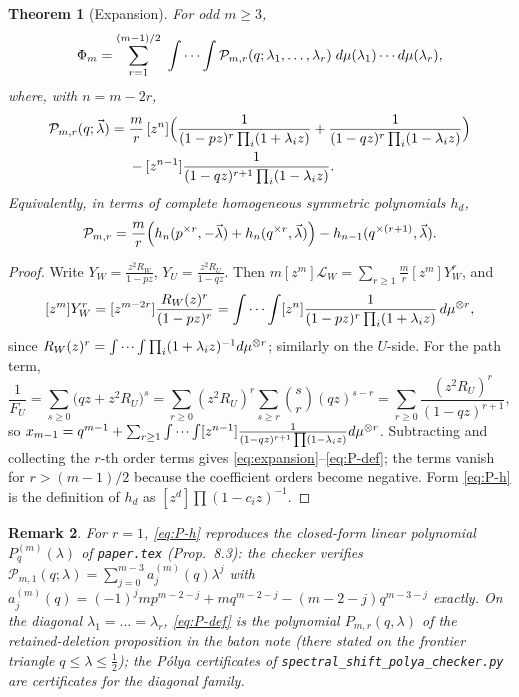 \documentclass[11pt]{article}
\newtheorem{theorem}{Theorem}[section]
\newtheorem{remark}[theorem]{Remark}
\newcommand{\Pcal}{\mathcal P}
\begin{document}
\begin{theorem}[Expansion]\label{thm:expansion}
For odd $m\ge3$,
\begin{equation}\label{eq:expansion}
        \Phi_m=\sum_{r=1}^{(m-1)/2}\ \idotsint\Pcal_{m,r}(q;\lambda_1,\dots,\lambda_r)\;d\mu(\lambda_1)\cdots d\mu(\lambda_r),
\end{equation}
where, with $n=m-2r$,
\begin{equation}\label{eq:P-def}
\begin{aligned}
        \Pcal_{m,r}(q;\vec\lambda)
        ={}&\frac mr\,[z^{n}]\Bigl(\frac{1}{(1-pz)^r\prod_i(1+\lambda_iz)}
        +\frac{1}{(1-qz)^r\prod_i(1-\lambda_iz)}\Bigr)\\
        &-[z^{n-1}]\frac{1}{(1-qz)^{r+1}\prod_i(1-\lambda_iz)} .
\end{aligned}
\end{equation}
Equivalently, in terms of complete homogeneous symmetric polynomials $h_d$,
\begin{equation}\label{eq:P-h}
        \Pcal_{m,r}=\frac mr\Bigl(h_n(p^{\times r},-\vec\lambda)+h_n(q^{\times r},\vec\lambda)\Bigr)
        -h_{n-1}(q^{\times(r+1)},\vec\lambda).
\end{equation}
\end{theorem}

\begin{proof}
Write $Y_W=\frac{z^2R_W}{1-pz}$, $Y_U=\frac{z^2R_U}{1-qz}$.  Then
$m[z^m]\mathcal L_W=\sum_{r\ge1}\frac mr[z^m]Y_W^r$, and
\[
        [z^m]Y_W^r=[z^{m-2r}]\frac{R_W(z)^r}{(1-pz)^r}
        =\idotsint[z^{n}]\frac{1}{(1-pz)^r\prod_i(1+\lambda_iz)}\,d\mu^{\otimes r},
\]
since $R_W(z)^r=\idotsint\prod_i(1+\lambda_iz)^{-1}d\mu^{\otimes r}$; similarly on the $U$-side.  For the path term,
\[
        \frac1{F_U}=\sum_{s\ge0}\bigl(qz+z^2R_U\bigr)^s
        =\sum_{r\ge0}(z^2R_U)^r\sum_{s\ge r}\binom sr(qz)^{s-r}
        =\sum_{r\ge0}\frac{(z^2R_U)^r}{(1-qz)^{r+1}},
\]
so $x_{m-1}=q^{m-1}+\sum_{r\ge1}\idotsint[z^{n-1}]\frac{1}{(1-qz)^{r+1}\prod(1-\lambda_iz)}d\mu^{\otimes r}$.  Subtracting and collecting the $r$-th order terms gives \eqref{eq:expansion}--\eqref{eq:P-def}; the terms vanish for $r>(m-1)/2$ because the coefficient orders become negative.  Form \eqref{eq:P-h} is the definition of $h_d$ as $[z^d]\prod(1-c_iz)^{-1}$.
\end{proof}

\begin{remark}
For $r=1$, \eqref{eq:P-h} reproduces the closed-form linear polynomial $P_q^{(m)}(\lambda)$ of \texttt{paper.tex} (Prop.~8.3): the checker verifies
$\Pcal_{m,1}(q;\lambda)=\sum_{j=0}^{m-3}a_j^{(m)}(q)\lambda^j$ with $a_j^{(m)}(q)=(-1)^jm p^{m-2-j}+mq^{m-2-j}-(m-2-j)q^{m-3-j}$ exactly.  On the diagonal $\lambda_1=\dots=\lambda_r$, \eqref{eq:P-def} is the polynomial $P_{m,r}(q,\lambda)$ of the retained-deletion proposition in the baton note (there stated on the frontier triangle $q\le\lambda\le\tfrac12$); the P\'olya certificates of \texttt{spectral\_shift\_polya\_checker.py} are certificates for the diagonal family.
\end{remark}
\end{document}
